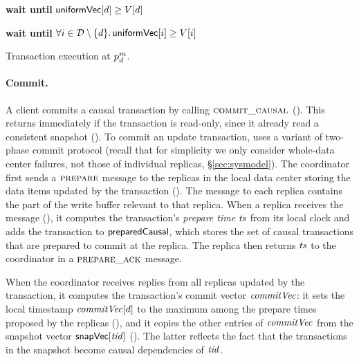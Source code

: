 \begin{algorithm}
\begin{algorithmic}[1]
    \SpaceHandler

    \Function{\MAKEUNIFORM}{\avc}\label{line:barrier}
      \State \textbf{wait until} $\uniformsnapshot[d] \ge \avc[d]$ \label{line:waituniform}
    \EndFunction

    \SpaceHandler

    \Function{\ATTACH}{\avc}\label{line:attach}
    \State \textbf{wait until} $\forall i \in \DC \setminus \{d\}.\, \uniformsnapshot[i] \ge \avc[i]$\label{line:waitattach}
    \EndFunction
  \end{algorithmic}
  \caption{Transaction execution at $\partition^m_d$.}
  \label{alg:txncoord1}
  \label{alg:txnpartition}
\end{algorithm}

\paragraph{Commit.}
A client commits a causal transaction by calling $\textsc{commit\_causal}$
(). This returns immediately if the
transaction is read-only, since it already read a consistent snapshot
().  To commit an update transaction,
\System uses a variant of two-phase commit protocol (recall that for simplicity
we only consider whole-data center failures, not those of individual replicas,
\S\ref{sec:sysmodel}).
The coordinator first sends a $\textsc{prepare}$ message to the replicas in the
local data center storing the data items updated by the transaction
(). The message to each replica
contains the part of the write buffer relevant to that replica. When a replica
receives the message
(), it computes the
transaction's \emph{prepare time} $\ts$ from its local clock and adds the
transaction to ${\sf preparedCausal}$, which stores the set of causal transactions that
are prepared to commit at the replica. The replica then returns $\ts$ to the
coordinator in a $\textsc{prepare\_ack}$ message.

When the coordinator receives replies from all replicas updated by the
transaction, it computes the transaction's commit vector $\commitvector$: it
sets the local timestamp $\commitvector[d]$ to the maximum among the prepare
times proposed by the replicas
(), and it copies the other
entries of $\commitvector$ from the snapshot vector $\vecsnapshottime[\tx]$
(). The latter reflects the
fact that the transactions in the snapshot become causal dependencies of $\tx$.


